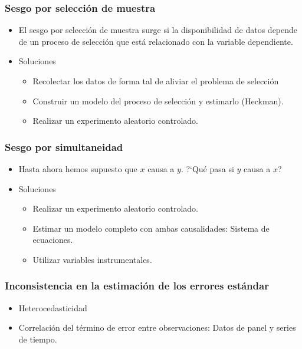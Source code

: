 \documentclass[t, compress, spanish, aspectratio=169]{beamer}
\newcommand{\term}[1]{\structure{\textbf{#1}}} %
\begin{document}
\begin{frame}
    \frametitle{Sesgo por selecci\'on de muestra}
    \begin{itemize}
        \item El sesgo por selecci\'on de muestra surge si la disponibilidad de datos depende de un proceso de selecci\'on que est\'a relacionado con la variable dependiente.
        \item Soluciones
        \begin{itemize}
            \item Recolectar los datos de forma tal de aliviar el problema de selecci\'on
            \item Construir un modelo del proceso de selecci\'on y estimarlo (Heckman).
            \item Realizar un experimento aleatorio controlado.
        \end{itemize}
    \end{itemize}
\end{frame}
\begin{frame}
    \frametitle{Sesgo por simultaneidad}
    \begin{itemize}
        \item Hasta ahora hemos supuesto que $x$ causa a $y$. ?`Qu\'e pasa si $y$ causa a $x$? \term{(feedback effect)}
        \item Soluciones
        \begin{itemize}
            \item Realizar un experimento aleatorio controlado.
            \item Estimar un modelo completo con ambas causalidades: Sistema de ecuaciones.
            \item Utilizar variables instrumentales.
        \end{itemize}
    \end{itemize}
\end{frame}
\begin{frame}
    \frametitle{Inconsistencia en la estimaci\'on de los errores est\'andar}
    \begin{itemize}
        \item Heterocedasticidad
        \item Correlaci\'on del t\'ermino de error entre observaciones: Datos de panel y series de tiempo.
    \end{itemize}
\end{frame}
\end{document}
